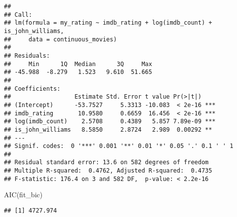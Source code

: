 \documentclass[
]{article}
\newenvironment{Shaded}{\begin{snugshade}}{\end{snugshade}}
\newcommand{\AttributeTok}[1]{\textcolor[rgb]{0.77,0.63,0.00}{#1}}
\newcommand{\DecValTok}[1]{\textcolor[rgb]{0.00,0.00,0.81}{#1}}
\newcommand{\FunctionTok}[1]{\textcolor[rgb]{0.00,0.00,0.00}{#1}}
\newcommand{\NormalTok}[1]{#1}
\newcommand{\SpecialCharTok}[1]{\textcolor[rgb]{0.00,0.00,0.00}{#1}}
\newcommand{\StringTok}[1]{\textcolor[rgb]{0.31,0.60,0.02}{#1}}
\begin{document}
\begin{verbatim}
## 
## Call:
## lm(formula = my_rating ~ imdb_rating + log(imdb_count) + is_john_williams, 
##     data = continuous_movies)
## 
## Residuals:
##     Min      1Q  Median      3Q     Max 
## -45.988  -8.279   1.523   9.610  51.665 
## 
## Coefficients:
##                  Estimate Std. Error t value Pr(>|t|)    
## (Intercept)      -53.7527     5.3313 -10.083  < 2e-16 ***
## imdb_rating       10.9580     0.6659  16.456  < 2e-16 ***
## log(imdb_count)    2.5708     0.4389   5.857 7.89e-09 ***
## is_john_williams   8.5850     2.8724   2.989  0.00292 ** 
## ---
## Signif. codes:  0 '***' 0.001 '**' 0.01 '*' 0.05 '.' 0.1 ' ' 1
## 
## Residual standard error: 13.6 on 582 degrees of freedom
## Multiple R-squared:  0.4762, Adjusted R-squared:  0.4735 
## F-statistic: 176.4 on 3 and 582 DF,  p-value: < 2.2e-16
\end{verbatim}

\begin{Shaded}
\begin{Highlighting}[]
\FunctionTok{AIC}\NormalTok{(fit\_bic)}
\end{Highlighting}
\end{Shaded}

\begin{verbatim}
## [1] 4727.974
\end{verbatim}

\begin{Shaded}
\end{Shaded}
\end{document}

